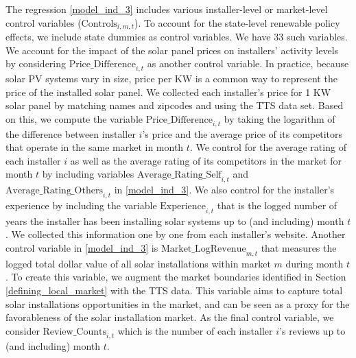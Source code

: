\documentclass[msom,blindrev]{informs3}
\begin{document}
	
	The regression \eqref{model_ind_3} includes various installer-level or market-level control variables ($\text{Controls}_{i,m,t}$).  To account for the state-level renewable policy effects, we include state dummies as control variables. We have 33 such variables. We account for the impact of the solar panel prices on installers' activity levels by considering $\text{Price\_Difference}_{i,t}$ as another control variable.  In practice, because solar PV systems vary in size, price per KW is a common way to represent the price of the installed solar panel. We collected each installer's price for 1 KW solar panel by matching names and zipcodes and using the TTS data set. Based on this, we compute the variable $\text{Price\_Difference}_{i,t}$ by taking the logarithm of the difference between installer $i$'s price and the average price of its competitors that operate in the same market in month $t$.  We control for the average rating of each installer $i$ as well as the average rating of its competitors in the market for month $t$ by including variables $\text{Average\_Rating\_Self}_{i,t}$ and $\text{Average\_Rating\_Others}_{i,t}$ in \eqref{model_ind_3}. We also control for the installer's experience by including the variable $\text{Experience}_{i,t}$ that is the logged number of years the installer has been installing solar systems up to (and including) month $t$. We collected this information one by one from each installer's website. Another control variable in \eqref{model_ind_3} is $\text{Market\_LogRevenue}_{m,t}$  that measures the logged total dollar value of all solar installations within market $m$ during month $t$. To create this variable, we augment the market boundaries identified in Section \ref{defining_local_market} with the TTS data. This variable aims to capture total solar installations opportunities in the market, and can be seen as a proxy for the favorableness of the solar installation market. As the final control variable, we consider  $\text{Review\_Counts}_{i,t}$ which is the number of each installer $i$'s reviews up to (and including) month $t$.
	
	
	
	
	
\end{document}
